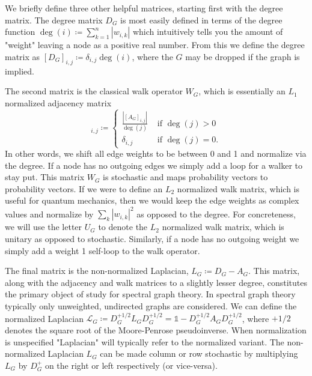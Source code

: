 \documentclass{article}
\newcommand{\identity}{\mathds{1}}
\begin{document}
We briefly define three other helpful matrices, starting first with the degree matrix. The degree matrix $D_G$ is most easily defined in terms of the degree function $\deg (i) \coloneqq \sum_{k = 1}^n | w_{i, k}|$ which intuitively tells you the amount of "weight" leaving a node as a positive real number. From this we define the degree matrix as $[D_G]_{i,j} \coloneqq \delta_{i,j} \deg (i)$, where the $G$ may be dropped if the graph is implied. 

The second matrix is the classical walk operator $W_{G}$, which is essentially an $L_1$ normalized adjacency matrix
\begin{equation}
[W_G]_{i,j} \coloneqq 
    \begin{cases}
        \frac{|[A_G]_{i,j}|}{\deg (j)} & \text{ if } \deg (j) > 0 \\
        \delta_{i,j} & \text{ if } \deg (j) = 0.
    \end{cases}
\end{equation}
In other words, we shift all edge weights to be between 0 and 1 and normalize via the degree. If a node has no outgoing edges we simply add a loop for a walker to stay put. This matrix $W_G$ is stochastic and maps probability vectors to probability vectors. If we were to define an $L_2$ normalized walk matrix, which is useful for quantum mechanics, then we would keep the edge weights as complex values and normalize by $\sum_{k} | w_{i,k} |^2$ as opposed to the degree. For concreteness, we will use the letter $U_G$ to denote the $L_2$ normalized walk matrix, which is unitary as opposed to stochastic. Similarly, if a node has no outgoing weight we simply add a weight 1 self-loop to the walk operator.

The final matrix is the non-normalized Laplacian, $L_G \coloneqq D_G - A_G$. This matrix, along with the adjacency and walk matrices to a slightly lesser degree, constitutes the primary object of study for spectral graph theory. In spectral graph theory typically only unweighted, undirected graphs are considered. We can define the normalized Laplacian $\mathcal{L}_G \coloneqq D_G^{+1/2} L_G D_G^{+1/2} = \identity - D_G^{+1/2} A_G D_G^{+1/2}$, where $+1/2$ denotes the square root of the Moore-Penrose pseudoinverse. When normalization is unspecified "Laplacian" will typically refer to the normalized variant. The non-normalized Laplacian $L_G$ can be made column or row stochastic by multiplying $L_G$ by $D_G^{+}$ on the right or left respectively (or vice-versa).
\end{document}
